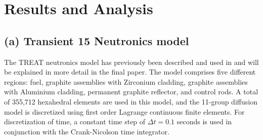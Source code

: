 \documentclass{anstrans}
\begin{document}
\section{Results and Analysis}

\subsection{(a) Transient 15 Neutronics model}\label{sec:macro_model}
The TREAT neutronics model has previously been described and used in \cite{DeHart2016} and will be explained in more detail in the final paper.
The model comprises five different regions: fuel, graphite assemblies with Zirconium cladding, graphite assemblies with Aluminium cladding, permanent graphite reflector, and control rods. A total of 355,712 hexahedral elements are used in this model, and the 11-group diffusion model is discretized using first order Lagrange continuous finite elements. For discretization of time, a constant time step of $\Delta t = 0.1$ seconds is used in conjunction with the Crank-Nicolson time integrator.



\end{document}
